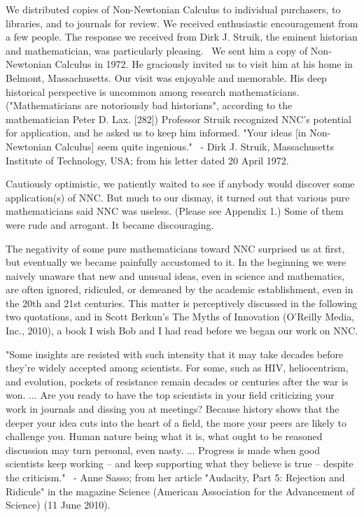 \documentclass[12pt]{article}
\begin{document}
We distributed copies of Non-Newtonian Calculus to individual purchasers, to libraries, and to journals for review. We received enthusiastic encouragement from a few people. The response we received from Dirk J. Struik, the eminent historian and mathematician, was particularly pleasing.  We sent him a copy of Non-Newtonian Calculus in 1972. He graciously invited us to visit him at his home in Belmont, Massachusetts. Our visit was enjoyable and memorable. His deep historical perspective is uncommon among research mathematicians. ("Mathematicians are notoriously bad historians", according to the mathematician Peter D. Lax. [282]) Professor Struik recognized NNC's potential for application, and he asked us to keep him informed.
"Your ideas [in Non-Newtonian Calculus] seem quite ingenious."
 - Dirk J. Struik, Massachusetts Institute of Technology, USA; from his letter dated 20 April 1972.

Cautiously optimistic, we patiently waited to see if anybody would discover some application(s) of NNC. But much to our dismay, it turned out that various pure mathematicians said NNC was useless. (Please see Appendix 1.) Some of them were rude and arrogant. It became discouraging. 

The negativity of some pure mathematicians toward NNC surprised us at first, but eventually we became painfully accustomed to it. In the beginning we were naively unaware that new and unusual ideas, even in science and mathematics, are often ignored, ridiculed, or demeaned by the academic establishment, even in the 20th and 21st centuries. This matter is perceptively discussed in the following two quotations, and in Scott Berkun's The Myths of Innovation (O'Reilly Media, Inc., 2010), a book I wish Bob and I had read before we began our work on NNC.

"Some insights are resisted with such intensity that it may take decades before they're widely accepted among scientists. For some, such as HIV, heliocentrism, and evolution, pockets of resistance remain decades or centuries after the war is won. ... Are you ready to have the top scientists in your field criticizing your work in journals and dissing you at meetings? Because history shows that the deeper your idea cuts into the heart of a field, the more your peers are likely to challenge you. Human nature being what it is, what ought to be reasoned discussion may turn personal, even nasty. ... Progress is made when good scientists keep working -- and keep supporting what they believe is true -- despite the criticism."
 - Anne Sasso; from her article "Audacity, Part 5: Rejection and Ridicule" in the magazine Science (American Association for the Advancement of Science) (11 June 2010). 
\end{document}
